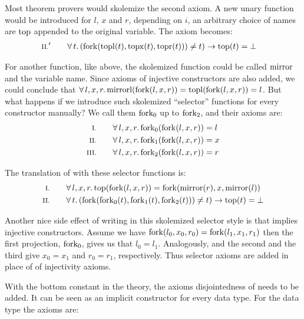 Most theorem provers would skolemize the second
axiom. A new unary function would be introduced for $l$, $x$ and $r$,
depending on $i$, an arbitrary choice of names are $\mathrm{top}$
appended to the original variable. The axiom becomes:
\begin{align*}
\rom{2}' \qquad & \fa{t} (\fn{fork}(\fn{topl}(t),\fn{topx}(t),\fn{topr}(t))) \neq t) \rightarrow \fn{top}(t) \eq \bot
\end{align*}

For another function, like  above, the skolemized function
could be called $\mathrm{mirror}$ and the variable name. Since axioms of
injective constructors are also added, we could conclude that
$\forall \, l , x , r . \, \mathrm{mirrorl}(\mathrm{fork}(l,x,r)) =
\mathrm{topl}(\mathrm{fork}(l,x,r)) = l$. But what happens if we introduce
such skolemized ``selector'' functions for every constructor manually?
We call them $\mathrm{fork_0}$ up to $\mathrm{fork_2}$, and their axioms are:
\begin{align*}
\rom{1} \qquad \faaa{l}{x}{r} \fn{fork_{0}}(\fn{fork}(l,x,r)) & \eq l\\
\rom{2} \qquad \faaa{l}{x}{r} \fn{fork_{1}}(\fn{fork}(l,x,r)) & \eq x\\
\rom{3} \qquad \faaa{l}{x}{r} \fn{fork_{2}}(\fn{fork}(l,x,r)) & \eq r
\end{align*}

\noindent
The translation of  with these selector functions is:
\begin{align*}
\rom{1} \qquad & \faaa{l}{x}{r} \fn{top}(\fn{fork}(l,x,r)) \eq \fn{fork}(\fn{mirror}(r),x,\fn{mirror}(l)) \\
\rom{2} \qquad & \fa{t}         (\fn{fork}(\fn{fork_0}(t),\fn{fork_1}(t),\fn{fork_2}(t))) \neq t) \rightarrow \fn{top}(t) \eq \bot
\end{align*}

\noindent
Another nice side effect of writing in this skolemized selector style
is that implies injective constructors. Assume we have
$\mathrm{fork}(l_0,x_0,r_0)=\mathrm{fork}(l_1,x_1,r_1)$ then the first
projection, $\mathrm{fork_0}$, gives us that $l_0=l_1$. Analogously, and
the second and the third give $x_0=x_1$ and $r_0=r_1$,
respectively. Thus selector axioms are added in place of of
injectivity axioms.

With the bottom constant in the theory, the axioms disjointedness of
needs to be added. It can be seen as an implicit constructor for every
data type. For the  data type the axioms are:

